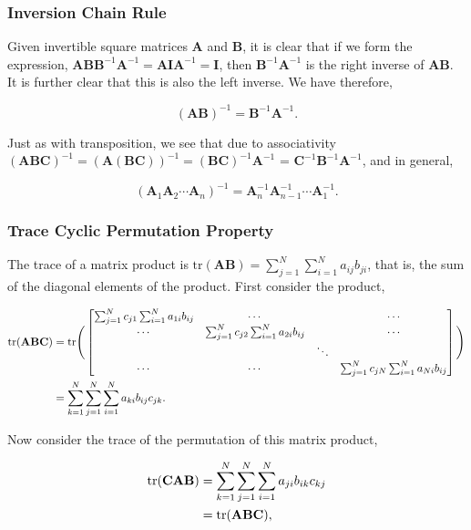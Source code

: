 \documentclass[11pt]{amsart}
\begin{document}
\subsubsection{Inversion Chain Rule}

Given invertible square matrices \textbf{A} and \textbf{B}, it is clear that if we form the expression, $\mathbf{AB}\mathbf{B}^{-1}\mathbf{A}^{-1} = \mathbf{A}\mathbf{I}\mathbf{A}^{-1} = \mathbf{I}$, then $\mathbf{B}^{-1}\mathbf{A}^{-1}$ is the right inverse of $\mathbf{AB}$. It is further clear that this is also the left inverse. We have therefore,

$$(\mathbf{AB})^{-1} = \mathbf{B}^{-1}\mathbf{A}^{-1}.$$

Just as with transposition, we see that due to associativity $(\mathbf{ABC})^{-1} = (\mathbf{A(BC)})^{-1} = (\mathbf{BC})^{-1}\mathbf{A}^{-1}$ = $\mathbf{C}^{-1}\mathbf{B}^{-1}\mathbf{A}^{-1}$, and in general,

$$(\mathbf{A}_1\mathbf{A}_2\cdots \mathbf{A}_n)^{-1} = \mathbf{A}_n^{-1}\mathbf{A}_{n-1}^{-1}\cdots\mathbf{A}_1^{-1}.$$

\subsubsection{Trace Cyclic Permutation Property}

The trace of a matrix product is $\text{tr}(\mathbf{A}\mathbf{B}) = \sum_{j=1}^N\sum_{i = 1}^N a_{ij}b_{ji}$, that is, the sum of the diagonal elements of the product. First consider the product,

\begin{align}
\text{tr}(\mathbf{A}\mathbf{B}\mathbf{C}) &= \text{tr}\Bigg(\begin{bmatrix}
\sum_{j=1}^N c_{j1}\sum_{i=1}^Na_{1i}b_{ij} & \cdots & & \cdots \\
\cdots & \sum_{j=1}^N c_{j2}\sum_{i=1}^Na_{2i}b_{ij} & & \cdots \\
 &  & \ddots & \\
\cdots & \cdots &&  \sum_{j=1}^N c_{jN}\sum_{i=1}^Na_{Ni}b_{ij} \\
\end{bmatrix}\Bigg) \notag \\
&= \sum_{k=1}^N\sum_{j=1}^N\sum_{i=1}^Na_{ki}b_{ij}c_{jk}. \notag
\end{align}

Now consider the trace of the permutation of this matrix product,

\begin{align}
\text{tr}(\mathbf{C}\mathbf{A}\mathbf{B}) &= \sum_{k=1}^N\sum_{j=1}^N\sum_{i=1}^Na_{ji}b_{ik}c_{kj} \notag \\
&= \text{tr}(\mathbf{A}\mathbf{B}\mathbf{C}), \notag
\end{align}
\end{document}
